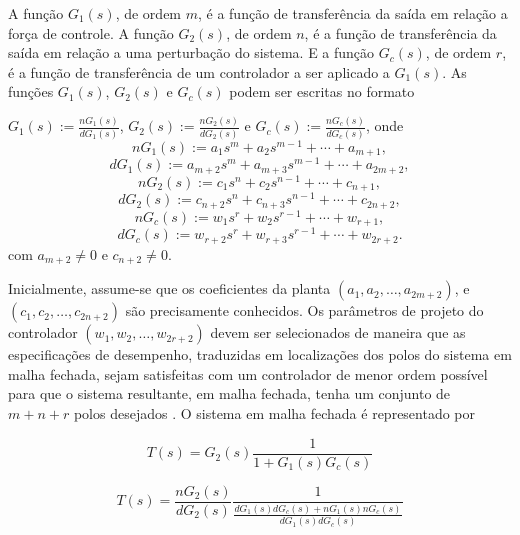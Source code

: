 \documentclass[journal,brazil,english]{IEEEtran}
\begin{document}
A função $G_1(s)$, de ordem $m$, é a função de transferência da saída em relação a força de controle. A função $G_2(s)$, de ordem $n$, é a função de transferência da saída em relação a uma perturbação do sistema. E a função $G_c(s)$, de ordem $r$, é a função de transferência de um controlador a ser aplicado a $G_1(s)$. As funções $G_1(s)$, $G_2(s)$ e $G_c(s)$ podem ser escritas no formato

$G_1(s) := \frac{nG_1(s)}{dG_1(s)}$, $G_2(s) := \frac{nG_2(s)}{dG_2(s)}$ e $G_c(s) := \frac{nG_c(s)}{dG_c(s)}$,
onde
\begin{equation}\label{nG1}
nG_1(s) := a_1s^m + a_2s^{m-1} + \cdots + a_{m+1},
\end{equation}
\begin{equation}\label{dG1}
dG_1(s) := a_{m+2}s^m + a_{m+3}s^{m-1} + \cdots + a_{2m+2},
\end{equation}
\begin{equation}\label{nG2}
nG_2(s) := c_1s^n + c_2s^{n-1} + \cdots + c_{n+1},
\end{equation}
\begin{equation}\label{dG2}
dG_2(s) := c_{n+2}s^n + c_{n+3}s^{n-1} + \cdots + c_{2n+2},
\end{equation}
\begin{equation}\label{nGc}
nG_c(s) := w_1s^r + w_2s^{r-1} + \cdots + w_{r+1},
\end{equation}
\begin{equation}\label{dGc}
dG_c(s) := w_{r+2}s^r + w_{r+3}s^{r-1} + \cdots + w_{2r+2}.
\end{equation}
com $a_{m+2} \neq 0$ e $c_{n+2} \neq 0$.

Inicialmente, assume-se que os coeficientes da planta $(a_1, a_2, \ldots, a_{2m+2})$, e $(c_1, c_2, \ldots, c_{2n+2})$ são precisamente conhecidos. Os parâmetros de projeto do controlador $(w_1, w_2, \ldots, w_{2r+2})$ devem ser selecionados de maneira que as especificações de desempenho, traduzidas em localizações dos polos do sistema em malha fechada, sejam satisfeitas com um controlador de menor ordem possível para que o sistema resultante, em malha fechada, tenha um conjunto de $m+n+r$ polos desejados \cite{maitelli}. O sistema em malha fechada é representado por

\begin{equation}\label{ts}
T(s) = G_2(s)\frac{1}{1+G_1(s)G_c(s)}
\end{equation}

\begin{equation}\label{ts1}
T(s) = \frac{nG_2(s)}{dG_2 (s)}\frac{1}{\frac{dG_1(s)dG_c(s)+nG_1(s)nG_c(s)}{dG_1(s)dG_c(s)}}
\end{equation}
\end{document}
